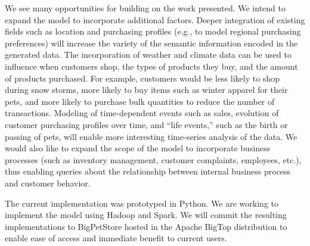 \documentclass[conference]{IEEEtran}
\begin{document}
We see many opportunities for building on the work presented.  We intend to expand the model to incorporate additional factors.  Deeper integration of existing fields such as location and purchasing profiles (e.g., to model regional purchasing preferences) will increase the variety of the semantic information encoded in the generated data. The incorporation of weather and climate data can be used to influence when customers shop, the types of products they buy, and the amount of products purchased. For example, customers would be less likely to shop during snow storms, more likely to buy items such as winter apparel for their pets, and more likely to purchase bulk quantities to reduce the number of transactions. Modeling of time-dependent events such as sales, evolution of customer purchasing profiles over time, and ``life events,'' such as the birth or passing of pets, will enable more interesting time-series analysis of the data.  We would also like to expand the scope of the model to incorporate business processes (such as inventory management, customer complaints, employees, etc.), thus enabling queries about the relationship between internal business process and customer behavior.

The current implementation was prototyped in Python.  We are working to implement the model using Hadoop and Spark.  We will commit the resulting implementations to BigPetStore hosted in the Apache BigTop distribution to enable ease of access and immediate benefit to current users. 



 


%
%
\end{document}
